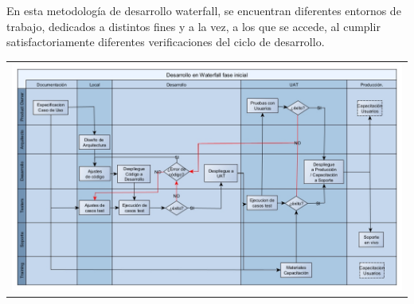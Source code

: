En esta metodología de desarrollo waterfall, se encuentran diferentes entornos de trabajo, dedicados a distintos fines y a la vez, a los que se accede, al cumplir satisfactoriamente diferentes verificaciones del ciclo de desarrollo.

\begin{tabular}{l}
\includegraphics[width=15cm]{waterfal_dev_phase1.jpg}
\end{tabular}

